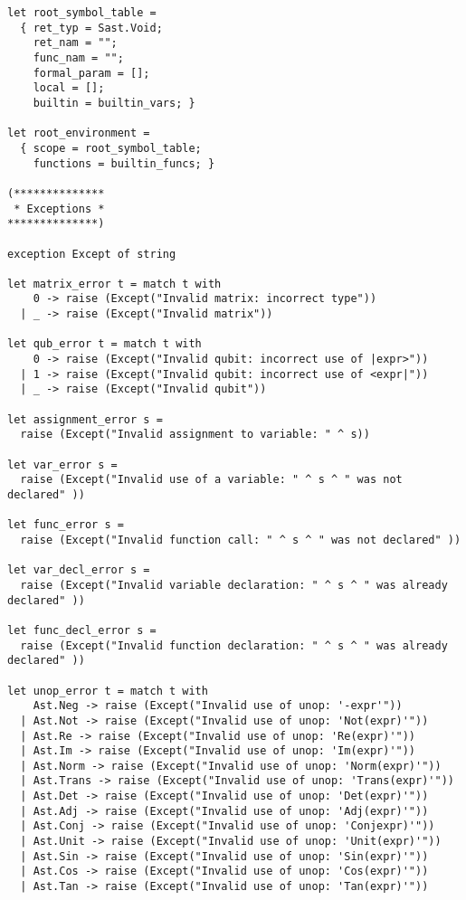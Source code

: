 \begin{lstlisting}
let root_symbol_table =
  { ret_typ = Sast.Void;
    ret_nam = "";
    func_nam = "";
    formal_param = [];
    local = []; 
    builtin = builtin_vars; }

let root_environment = 
  { scope = root_symbol_table;
    functions = builtin_funcs; }

(**************
 * Exceptions *
**************)

exception Except of string

let matrix_error t = match t with
    0 -> raise (Except("Invalid matrix: incorrect type"))
  | _ -> raise (Except("Invalid matrix"))

let qub_error t = match t with
    0 -> raise (Except("Invalid qubit: incorrect use of |expr>"))
  | 1 -> raise (Except("Invalid qubit: incorrect use of <expr|"))
  | _ -> raise (Except("Invalid qubit"))

let assignment_error s =
  raise (Except("Invalid assignment to variable: " ^ s))

let var_error s =
  raise (Except("Invalid use of a variable: " ^ s ^ " was not declared" ))

let func_error s =
  raise (Except("Invalid function call: " ^ s ^ " was not declared" ))

let var_decl_error s =
  raise (Except("Invalid variable declaration: " ^ s ^ " was already declared" ))

let func_decl_error s =
  raise (Except("Invalid function declaration: " ^ s ^ " was already declared" ))

let unop_error t = match t with
    Ast.Neg -> raise (Except("Invalid use of unop: '-expr'"))
  | Ast.Not -> raise (Except("Invalid use of unop: 'Not(expr)'"))
  | Ast.Re -> raise (Except("Invalid use of unop: 'Re(expr)'"))
  | Ast.Im -> raise (Except("Invalid use of unop: 'Im(expr)'"))
  | Ast.Norm -> raise (Except("Invalid use of unop: 'Norm(expr)'"))
  | Ast.Trans -> raise (Except("Invalid use of unop: 'Trans(expr)'"))
  | Ast.Det -> raise (Except("Invalid use of unop: 'Det(expr)'"))
  | Ast.Adj -> raise (Except("Invalid use of unop: 'Adj(expr)'"))
  | Ast.Conj -> raise (Except("Invalid use of unop: 'Conjexpr)'"))
  | Ast.Unit -> raise (Except("Invalid use of unop: 'Unit(expr)'"))
  | Ast.Sin -> raise (Except("Invalid use of unop: 'Sin(expr)'"))
  | Ast.Cos -> raise (Except("Invalid use of unop: 'Cos(expr)'"))
  | Ast.Tan -> raise (Except("Invalid use of unop: 'Tan(expr)'"))


\end{lstlisting}
